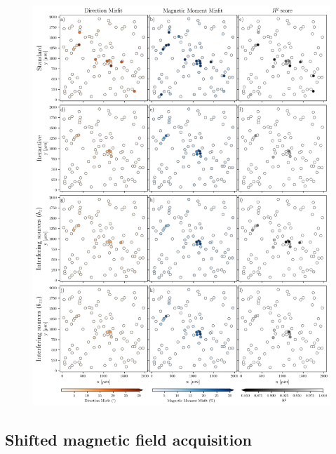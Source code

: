 \begin{figure}[tb!]
  \centering
  \includegraphics[width=1\linewidth]{figures/inversion-comparion-1.png}
  \caption{
      }
  \label{inversion1}
\end{figure}


\subsection{Shifted magnetic field acquisition}

